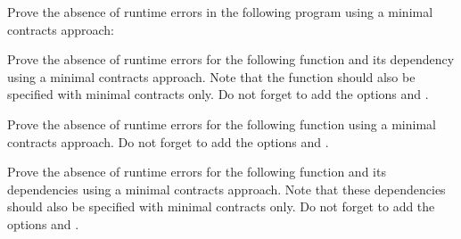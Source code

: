 Prove the absence of runtime errors in the following program using a minimal
contracts approach:








Prove the absence of runtime errors for the following 
function and its dependency using a minimal contracts approach. Note that the
 function should also be specified with minimal contracts only.
Do not forget to add the options  and
.








Prove the absence of runtime errors for the following 
function using a minimal contracts approach. Do not forget to add the options
 and .








Prove the absence of runtime errors for the following 
function and its dependencies using a minimal contracts approach. Note that
these dependencies should also be specified with minimal contracts only.
Do not forget to add the options  and
.





